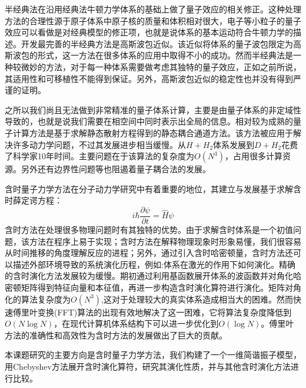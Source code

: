 半经典法在沿用经典法牛顿力学体系的基础上做了量子效应的相关修正\cite{semi_classical_1,semi_classical_2,semi_classical_3}。这种处理方法的合理性源于原子体系中原子核的质量和体积相对很大，电子等小粒子的量子效应可以看做是对经典模型的修正项，也就是说体系的基本运动符合牛顿力学的描述。开发最完善的半经典方法是高斯波包近似。该近似将体系的量子波包限定为高斯波包的形式，这一方法在很多体系的应用中取得不小的成功。然而半经典法是一种较微妙的方法，对于每一种体系需要做考虑其独特的量子效应，正如之前所说，其适用性和可移植性不能得到保证。另外，高斯波包近似的稳定性也并没有得到严谨的证明。

之所以我们尚且无法做到非常精准的量子体系计算，主要是由量子体系的非定域性导致的，也就是说我们需要在相空间中同时表示出全局的信息。相对较为成熟的量子计算方法是基于求解静态散射方程得到的静态耦合通道方法\cite{Coupled_Channel}。该方法被应用于解决许多动力学问题，不过其发展进步相当缓慢。从$H + H_2$体系发展到$D + H_2$花费了科学家10年时间\cite{H2D}。主要问题在于该算法的复杂度为$O(N^3)$，占用很多计算资源。另外还有边界性问题等也阻遏着量子耦合法的发展。

含时量子力学方法在分子动力学研究中有着重要的地位，其建立与发展基于求解含时薛定谔方程\cite{TD_Schrodinger_1,TD_Schrodinger_2,TD_Schrodinger_3,TD_Schrodinger_4,TD_Schrodinger_5}：
\begin{equation}
  i \hbar \frac{\partial \psi}{\partial t} = \hat{H} \psi  
  \label{eq:td-Schrodinger}
\end{equation} 
含时方法在处理很多物理问题时有其独特的优势。由于求解含时体系是一个初值问题，该方法在程序上易于实现；含时方法在解释物理现象时形象易懂，我们很容易从时间推移的角度理解反应的进程；另外，通过引入含时哈密顿量，含时方法还可以描述外部环境导致的系统演化历程，例如:体系在激光的作用下如何演化。精确的含时演化方法发展较为缓慢。期初通过利用基函数展开体系的波函数并对角化哈密顿矩阵得到特征向量和本征值，再进一步构造含时演化算符进行演化。矩阵对角化的算法复杂度为$O(N^3)$,这对于处理较大的真实体系造成相当大的困难。然而快速傅里叶变换(FFT)算法的出现有效地解决了这一困难，它将算法复杂度降低到$O(N\log N)$\cite{FFT_1,FFT_2}，在现代计算机体系结构下可以进一步优化到$O(\log N)$\cite{FFT_3}。傅里叶方法的准确性和高效性为含时方法的发展做出了巨大的贡献。

本课题研究的主要方向是含时量子力学方法，我们构建了一个一维简谐振子模型，用Chebyshev方法展开含时演化算符，研究其演化性质，并与其他含时演化方法进行比较。